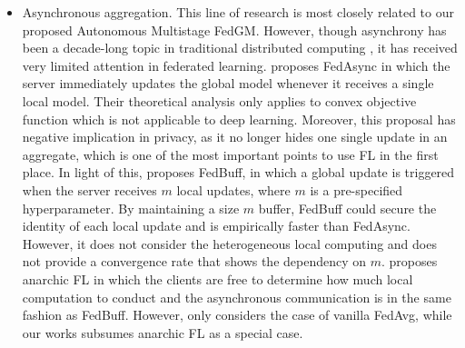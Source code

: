 \begin{itemize}[leftmargin=*]
    \item Asynchronous aggregation. This line of research is most closely related to our proposed Autonomous Multistage FedGM. However, though asynchrony has been a decade-long topic in traditional distributed computing \citep{Zhang2014DeepElasticAvg,Lian15Asynchronous,Zheng17ASGD}, it has received very limited attention in federated learning. \cite{Xie2019AsynchronousFO} proposes FedAsync in which the server immediately updates the global model whenever it receives a single local model. Their theoretical analysis only applies to convex objective function which is not applicable to deep learning. Moreover, this proposal has negative implication in privacy, as it no longer hides one single update in an aggregate, which is one of the most important points to use FL in the first place. In light of this, \cite{Nguyen2021FedBuff} proposes FedBuff, in which a global update is triggered when the server receives $m$ local updates, where $m$ is a pre-specified hyperparameter. By maintaining a size $m$ buffer, FedBuff could secure the identity of each local update and is empirically faster than FedAsync. However, it does not consider the heterogeneous local computing and does not provide a convergence rate that shows the dependency on $m$. \cite{Yang2021AnarchicFL} proposes anarchic FL in which the clients are free to determine how much local computation to conduct and the asynchronous communication is in the same fashion as FedBuff. However, \cite{Yang2021AnarchicFL} only considers the case of vanilla FedAvg, while our works subsumes anarchic FL as a special case.
\end{itemize}

\fi

